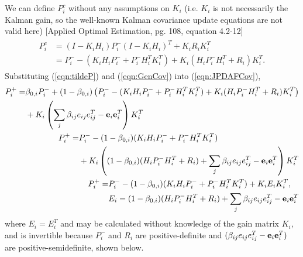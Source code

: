 \documentclass[10pt]{article}
\newcommand{\refeqn}[1]{(\ref{eqn:#1})}
\theoremstyle{plain}\theorembodyfont{\normalfont}
\begin{document}
We can define $P_i^c$ without any assumptions on $K_i$ (i.e. $K_i$ is not necessarily the Kalman gain, so the well-known Kalman covariance update equations are not valid here) [Applied Optimal Estimation, pg. 108, equation 4.2-12]
\begin{align}
\begin{split}
P^c_i&=(I-K_iH_i)P^-_i(I-K_iH_i)^T+K_iR_iK_i^T
\\
&=P^-_i-(K_iH_iP^-_i+P^-_iH_i^TK_i^T)+K_i(H_iP^-_iH_i^T+R_i)K_i^T.
\label{eqn:GenCov}
\end{split}
\end{align}
Substituting \refeqn{tildeP} and \refeqn{GenCov} into \refeqn{JPDAFCov},
\begin{align}
\begin{split}
P^+_{i}=&\beta_{0,i}P^-_{i}+(1-\beta_{0,i})\left(P^-_i-(K_iH_iP^-_i+P^-_iH_i^TK_i^T)+K_i(H_iP^-_iH_i^T+R_i)K_i^T\right)\\&+K_i\left({\sum\limits_{j} \beta_{ij}e_{ij}e_{ij}^T-{\bf{e}}_{i}}{\bf{e}}_{i}^T\right)K_{i}^T
\end{split}
\\
\begin{split}
P^+_{i}=&P^-_{i}-(1-\beta_{0,i})(K_iH_iP^-_i+P^-_iH_i^TK_i^T)\\&+K_i\left((1-\beta_{0,i})(H_iP^-_iH_i^T+R_i)+{\sum\limits_{j} \beta_{ij}e_{ij}e_{ij}^T-{\bf{e}}_{i}}{\bf{e}}_{i}^T\right)K_i^T
\end{split}
\\
\begin{split}
P^+_{i}=&P^-_{i}-(1-\beta_{0,i})(K_iH_iP^-_i+P^-_iH_i^TK_i^T)+K_iE_iK_i^T,\\
&E_i=(1-\beta_{0,i})(H_iP^-_iH_i^T+R_i)+{\sum\limits_{j} \beta_{ij}e_{ij}e_{ij}^T-{\bf{e}}_{i}}{\bf{e}}_{i}^T\label{eqn:CovExpanded}
\end{split}
\end{align}
where $E_i=E_i^T$ and may be calculated without knowledge of the gain matrix $K_i$, and is invertible because $P^-_i$ and $R_i$ are positive-definite and $(\beta_{ij}e_{ij}e_{ij}^T-{\bf{e}}_{i}{\bf{e}}_{i}^T)$ are positive-semidefinite, shown below. 
\end{document}
